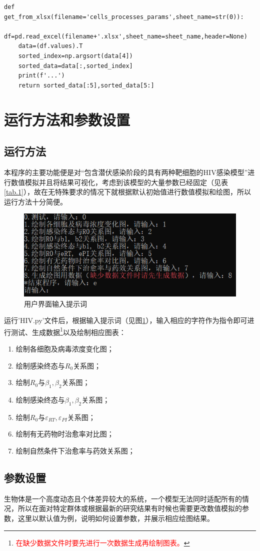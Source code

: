 \documentclass{ctexart}
\begin{document}
\begin{lstlisting}[label={lst.7}, caption={生成感染终态数据并在'.xlsx'文件中存读}]
def get_from_xlsx(filename='cells_processes_params',sheet_name=str(0)):
    df=pd.read_excel(filename+'.xlsx',sheet_name=sheet_name,header=None)
    data=(df.values).T
    sorted_index=np.argsort(data[4])
    sorted_data=data[:,sorted_index]
    print(f'...')
    return sorted_data[:5],sorted_data[5:]
\end{lstlisting}

\section{运行方法和参数设置}
\subsection{运行方法}
本程序的主要功能便是对“包含潜伏感染阶段的具有两种靶细胞的HIV感染模型”进行数值模拟并且将结果可视化，考虑到该模型的大量参数已经固定（见表\ref{tab.1}），故在无特殊要求的情况下就根据默认初始值进行数值模拟和绘图，所以运行方法十分简便。
\begin{figure}[H]
    \centering
    \includegraphics[width=0.6\linewidth]{0.01.png}
    \caption{用户界面输入提示词}
    \label{fig.0.01}
\end{figure}
运行'HIV.py'文件后，根据输入提示词（见图\ref{fig.0.01}），输入相应的字符作为指令即可进行测试、生成数据\footnote{\textcolor{red}{在缺少数据文件时要先进行一次数据生成再绘制图表。}}以及绘制相应图表：
\begin{enumerate}
    \item 绘制各细胞及病毒浓度变化图；
    \item 绘制感染终态与$R_{0}$关系图；
    \item 绘制$R_{0}$与$\beta_{1},\beta_{2}$关系图；
    \item 绘制感染终态与$\beta_{1},\beta_{2}$关系图；
    \item 绘制$R_{0}$与$\varepsilon _{RT},\varepsilon _{PI}$关系图；
    \item 绘制有无药物时治愈率对比图；
    \item 绘制自然条件下治愈率与药效关系图；
\end{enumerate}

\subsection{参数设置}
生物体是一个高度动态且个体差异较大的系统，一个模型无法同时适配所有的情况，所以在面对特定群体或根据最新的研究结果有时候也需要更改数值模拟的参数，这里以默认值为例，说明如何设置参数，并展示相应绘图结果。
\end{document}
